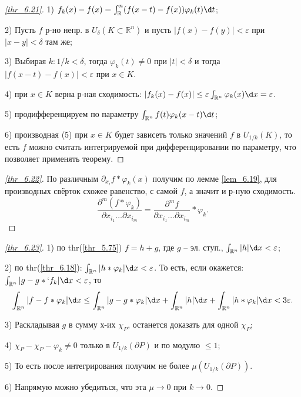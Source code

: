 \begin{proof}[\ref{thr_6.21}]
	
	1) $f_k(x) - f(x) = \int_\mathbb{R}^n (f(x-t) - f(x)) \varphi_k(t) \d t$;

	2) Пусть $f$ р-но непр. в $U_\delta(K\subset \mathbb{R}^n) $ и пусть $|f(x) - f(y)|<\varepsilon$ при $|x-y|<\delta$ там же;

	3) Выбирая $k\colon 1/k <\delta$, тогда $\varphi_k(t) \neq 0 $ при $|t|<\delta$ и тогда $|f(x-t) - f(x)|<\varepsilon$ при $x \in K$.

	4) при $x \in K$ верна р-ная сходимость: $|f_k(x) - f(x)| \leq \varepsilon \int_{\mathbb{R}^n}\varphi_k(x) \d x = \varepsilon$.

	5) продифференцируем по параметру $\int_{\mathbb{R}^n} f(t) \varphi_k (x-t)\d t $;

	6) производная (5) при $x \in K$ будет зависеть только значений $f$ в $U_{1/k}(K)$, то есть $f$ можно считать интегрируемой при дифференцировании по параметру, что позволяет применять теорему.
\end{proof}

\begin{proof}[\ref{thr_6.22}]
	 По различным $\partial_{x_i} f*\varphi_k(x)$ получим по лемме \ref{lem_6.19}, для производных свёрток схожее равенство, с самой $f$, а значит и р-ную сходимость.
	\begin{equation*}
		\frac{\partial^m (f*\varphi_k)}{\partial x_{i_1}\ldots \partial x_{i_m}} = \frac{\partial^m f}{\partial x_{i_1}\ldots \partial x_{i_m}}*\varphi_k.
	\end{equation*}
\end{proof}

\begin{proof}[\ref{thr_6.23}]
	1) по thr(\ref{thr_5.75}) $f = h + g$, где $g$ -- эл. ступ., $\int_{\mathbb{R}^n} |h|\d x <\varepsilon$;

	2) по thr(\ref{thr_6.18}): $\int_{\mathbb{R}^n}|h * \varphi_k|\d x < \varepsilon$. То есть, если окажется: $\int_{\mathbb{R}^n}|g - g*`f_k|\d x < \varepsilon$, то
	\begin{equation*}
		\int_{\mathbb{R}^n}|f - f*\varphi_k| \d x \leq \int_{\mathbb{R}^n} |g - g* \varphi_k|\d x + \int_{\mathbb{R}^n}|h|\d x + \int_{\mathbb{R}^n} |h*\varphi_k| \d x < 3 \varepsilon.
	\end{equation*}

	3) Раскладывая $g$ в сумму х-их $\chi_P$, останется доказать для одной $\chi_P$;

	4) $\chi_P - \chi_P - \varphi_k \neq 0$ только в $U_{1/k}(\partial P) $ и по модулю $\leq 1$;

	5) То есть после интегрирования получим не более $\mu(U_{1/k}(\partial P))$.

	6) Напрямую можно убедиться, что эта $\mu \rightarrow 0$ при $k\rightarrow 0$.
\end{proof}